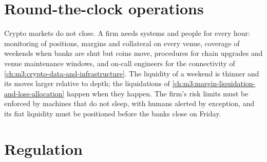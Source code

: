 \begin{omfigure}
\centering
{}

\label{fig:m3:the-crypto-trading-business:custody}
\end{omfigure}

\section{Round-the-clock operations}

Crypto markets do not close. A firm needs systems and people for every hour: monitoring of positions, margins and collateral on every venue, coverage of
weekends when banks are shut but coins move, procedures for chain upgrades and venue maintenance windows, and on-call engineers for the connectivity of
\cref{ch:m3:crypto-data-and-infrastructure}. The liquidity of a weekend is thinner and its moves larger relative to depth; the liquidations of
\cref{ch:m3:margin-liquidation-and-loss-allocation} happen when they happen. The firm's risk limits must be enforced by machines that do not sleep, with humans
alerted by exception, and its fiat liquidity must be positioned before the banks close on Friday.

\section{Regulation}

